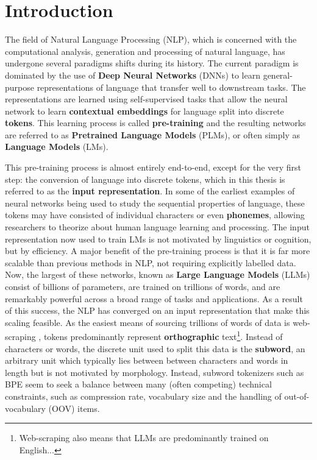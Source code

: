 \chapter{Introduction}

The field of Natural Language Processing (NLP), which is concerned with the computational analysis, generation and processing of natural language, has undergone several paradigms shifts during its history. The current paradigm is dominated by the use of \textbf{Deep Neural Networks} (DNNs) to learn general-purpose representations of language that transfer well to downstream tasks. The representations are learned using self-supervised tasks that allow the neural network to learn \textbf{contextual embeddings} for language split into discrete \textbf{tokens}. This learning process is called \textbf{pre-training} and the resulting networks are referred to as \textbf{Pretrained Language Models} (PLMs), or often simply as \textbf{Language Models} (LMs). 

This pre-training process is almost entirely end-to-end, except for the very first step: the conversion of language into discrete tokens, which in this thesis is referred to as the \textbf{input representation}. In some of the earliest examples of neural networks being used to study the sequential properties of language, these tokens may have consisted of individual characters or even \textbf{phonemes}, allowing researchers to theorize about human language learning and processing. The input representation now used to train LMs is not motivated by linguistics or cognition, but by efficiency. A major benefit of the pre-training process is that it is far more scalable than previous methods in NLP, not requiring explicitly labelled data. Now, the largest of these networks, known as \textbf{Large Language Models} (LLMs) consist of billions of parameters, are trained on trillions of words, and are remarkably powerful across a broad range of tasks and applications. As a result of this success, the NLP has converged on an input representation that make this scaling feasible. As the easiest means of sourcing trillions of words of data is web-scraping \addcites, tokens predominantly represent \textbf{orthographic} text\footnote{Web-scraping also means that LLMs are predominantly trained on English...}. Instead of characters or words, the discrete unit used to split this data is the \textbf{subword}, an arbitrary unit which typically lies between between characters and words in length but is not motivated by morphology. Instead, subword tokenizers such as BPE seem to seek a balance between many (often competing) technical constraints, such as compression rate, vocabulary size and the handling of out-of-vocabulary (OOV) items.

